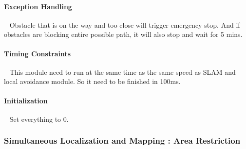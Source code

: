 \documentclass[12pt]{article}
\begin{document}
            \paragraph{Exception Handling}
                ~\newline
                Obstacle that is on the way and too close will trigger emergency stop. And if obstacles are blocking entire possible path, it will also stop and wait for 5 mins. \\
                
            \paragraph{Timing Constraints}
                ~\newline
                This module need to run at the same time as the same speed as SLAM and local avoidance module. So it need to be finished in 100ms. \\
                
            \paragraph{Initialization}
                ~\newline
                Set everything to 0. \\
                
        \newpage
        \subsubsection{Simultaneous Localization and Mapping : Area Restriction}
\end{document}
